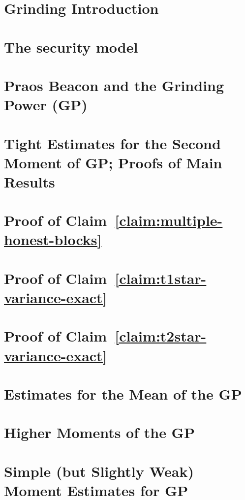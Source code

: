 \chapter{Grinding Introduction }\label{ch:grinding-intro}


\chapter{The security model}\label{sec:model-grinding}


% 

\chapter{Praos Beacon and the Grinding Power (GP)}\label{sec:praos}



\chapter{Tight Estimates for the Second Moment of GP; Proofs of Main Results}\label{sec:praos-second-moment}\label{sec:main-theorems}




\chapter{Proof of Claim~\ref{claim:multiple-honest-blocks}}\label{sec:praos-claim-multiple-honest-blocks}



\chapter{Proof of Claim~\ref{claim:t1star-variance-exact}}\label{sec:praos-claim-t1star-variance-exact}



\chapter{Proof of Claim~\ref{claim:t2star-variance-exact}}\label{sec:praos-claim-t2star-variance-exact}



\chapter{Estimates for the Mean of the GP}



\chapter{Higher Moments of the GP}



\chapter{Simple (but Slightly Weak) Moment Estimates for GP}\label{app:grinding-praos}



